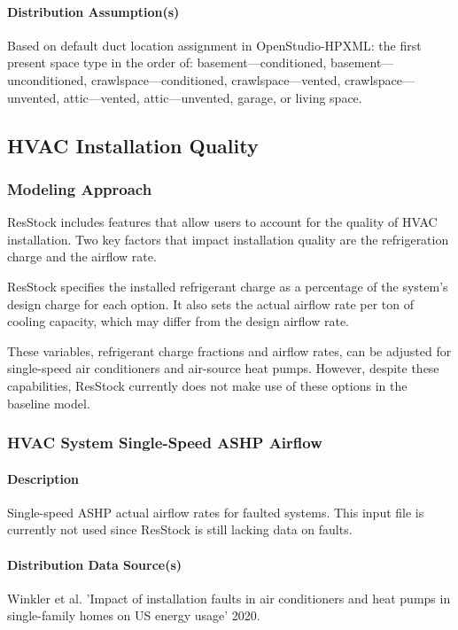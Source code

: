 \paragraph{Distribution Assumption(s)}
Based on default duct location assignment in OpenStudio-HPXML: the first present space type in the order of: basement---conditioned, basement---unconditioned, crawlspace---conditioned, crawlspace---vented, crawlspace---unvented, attic---vented, attic---unvented, garage, or living space. 


\subsection{HVAC Installation Quality}
\subsubsection{Modeling Approach}
ResStock includes features that allow users to account for the quality of HVAC installation. Two key factors that impact installation quality are the refrigeration charge and the airflow rate.

ResStock specifies the installed refrigerant charge as a percentage of the system's design charge for each option. It also sets the actual airflow rate per ton of cooling capacity, which may differ from the design airflow rate.

These variables, refrigerant charge fractions and airflow rates, can be adjusted for single-speed air conditioners and air-source heat pumps. However, despite these capabilities, ResStock currently does not make use of these options in the baseline model.

\subsubsection{HVAC System Single-Speed ASHP Airflow}

\paragraph{Description}
Single-speed ASHP actual airflow rates for faulted systems. This input file is currently not used since ResStock is still lacking data on faults. 
\paragraph{Distribution Data Source(s)}
Winkler et al. 'Impact of installation faults in air conditioners and heat pumps in single-family homes on US energy usage' 2020.
